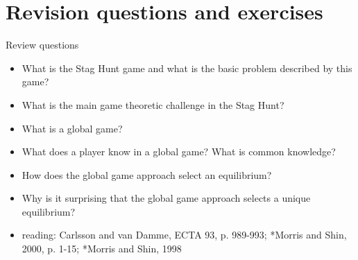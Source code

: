 \documentclass[bigger,allowframebreaks]{beamer}
\begin{document}
\section{Revision questions and exercises}
\label{sec-3}
\begin{frame}[label=sec-3-1]{Review questions}
\begin{itemize}
\item What is the Stag Hunt game and what is the basic problem described by this game?
\item What is the main game theoretic challenge in the Stag Hunt?
\item What is a global game?
\item What does a player know in a global game? What is common knowledge?
\item How does the global game approach select an equilibrium?
\item Why is it surprising that the global game approach selects a unique equilibrium?
\item reading: Carlsson and van Damme, ECTA 93, p. 989-993; *Morris and Shin, 2000, p. 1-15; *Morris and Shin, 1998
\end{itemize}
\end{frame}
\end{document}
